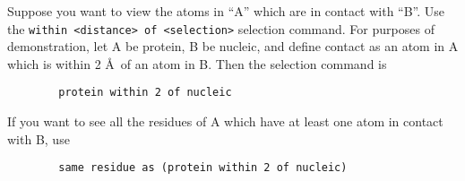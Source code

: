 Suppose you want to view the atoms in ``A'' which are in contact with
``B''.  Use the {\tt within <distance> of <selection>} selection
command.  For purposes of demonstration, let A be protein, B be
nucleic, and define contact as an atom in A which is within 2 \AA\ of
an atom in B.  Then the selection command is

\begin{verbatim}
        protein within 2 of nucleic
\end{verbatim}

        If you want to see all the residues of A which have at least
one atom in contact with B, use

\begin{verbatim}
        same residue as (protein within 2 of nucleic)
\end{verbatim}


